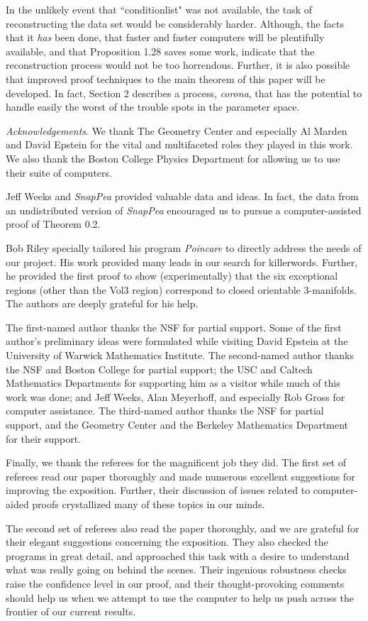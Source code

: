 In the unlikely event that  ``conditionlist" was not available, the task of 
reconstructing the data set would be considerably harder.  Although, the 
facts that it {\it has} been done, that faster and faster computers will be 
plentifully available, and that Proposition 1.28 saves some work, indicate 
that the reconstruction process would not be too horrendous.  Further, it is 
also possible that improved proof techniques to the main theorem of this 
paper will be developed.  In fact, Section 2 describes a process, {\it corona}, 
that has the potential to handle easily  the worst of the trouble spots in the 
parameter space.
 
 \pagebreak
{\it Acknowledgements}.  We thank The Geometry Center and
especially Al Marden and David Epstein for the vital and multifaceted roles
they played in  this work.   We also thank the Boston College Physics 
Department for allowing us to use their suite of computers.

Jeff Weeks and {\it SnapPea} provided  valuable data and
ideas.  In
fact, the data from an undistributed version of
{\it SnapPea} encouraged us to pursue a computer-assisted proof of Theorem 
0.2.  

Bob Riley specially tailored his program
{\it Poincar{\rm \'{\it e}}}
to directly address the needs of our project.  His work provided
many leads in our search for
killerwords.  Further, he provided the first proof to show (experimentally) 
that the six
exceptional regions (other than the Vol3 region) correspond to
closed orientable $3$-manifolds.  The authors are deeply grateful for his
help. 

The first-named author thanks
the NSF for partial support.  Some of the first author's preliminary ideas
were formulated while visiting
David Epstein at the University of Warwick Mathematics Institute.  The
second-named author thanks the NSF and Boston College for
partial support; the USC and Caltech Mathematics Departments for 
supporting
him as a visitor while much of
this work was done; and Jeff Weeks, Alan  Meyerhoff, and especially Rob
Gross for computer assistance.  The
third-named author thanks the NSF for partial support, and the Geometry 
Center and the Berkeley Mathematics Department for their support. 

Finally, we thank the referees for the magnificent job they did.  The first set 
of referees read our paper thoroughly and made numerous excellent 
suggestions for improving the exposition.  Further, their discussion of issues 
related to computer-aided proofs crystallized many of these topics in our 
minds.

The second set of referees also read the paper thoroughly, and we are 
grateful for their elegant suggestions concerning the exposition. 
They also checked the programs in great detail, and approached this task 
with a desire to understand what was really going on behind the scenes.  
Their ingenious robustness checks raise the confidence level in our proof, 
and their thought-provoking comments should help us when we attempt to 
use the computer to help us push across the frontier of our current results.
 







